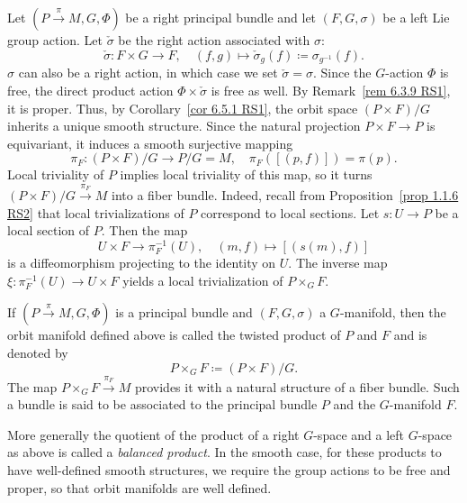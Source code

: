 Let $(P\overset{\pi}{\to}M,G,\Phi)$ be a right principal bundle and let $(F,G,\sigma)$ be a left Lie group action. Let $\check\sigma$ be the right action associated with $\sigma$:
\[\check\sigma:F\times G\to F,\quad (f,g)\mapsto \check{\sigma}_g(f)\coloneqq \sigma_{g^{-1}}(f).\]
$\sigma$ can also be a right action, in which case we set $\check\sigma=\sigma$. Since the $G$-action $\Phi$ is free, the direct product action $\Phi\times \check\sigma$ is free as well. By Remark~\ref{rem 6.3.9 RS1}, it is proper. Thus, by Corollary~\ref{cor 6.5.1 RS1}, the orbit space $(P\times F)\slash G$ inherits a unique smooth structure. Since the natural projection $P\times F\to P$ is equivariant, it induces a smooth surjective mapping
\[\pi_F:(P\times F)\slash G\to P\slash G=M,\quad \pi_F([(p,f)])=\pi(p).\]
Local triviality of $P$ implies local triviality of this map, so it turns $(P\times F)\slash G \overset{\pi_F}{\to } M$ into a fiber bundle. Indeed, recall from Proposition~\ref{prop 1.1.6 RS2} that local trivializations of $P$ correspond to local sections. Let $s:U\to P$ be a local section of $P$. Then the map
\[U\times F\to \pi_F^{-1}(U),\quad (m,f)\mapsto [(s(m),f)]\]
is a diffeomorphism projecting to the identity on $U$. The inverse map $\xi:\pi_F^{-1}(U)\to U\times F$ yields a local trivialization of $P\times_G F$.

\begin{defn}
    If $(P\overset{\pi}{\to}M,G,\Phi)$ is a principal bundle and  $(F,G,\sigma)$ a $G$-manifold, then the orbit manifold defined above is called the twisted product of $P$ and $F$ and is denoted by
    \[P\times_G F\coloneqq (P\times F)\slash G.\]
    The map $P\times_G F\overset{\pi_F}{\to } M$ provides it with a natural structure of a fiber bundle. Such a bundle is said to be associated to the principal bundle $P$ and the $G$-manifold $F$.
\end{defn}

More generally the quotient of the product of a right $G$-space and a left $G$-space as above is called a \emph{balanced product}. In the smooth case, for these products to have well-defined smooth structures, we require the group actions to be free and proper, so that orbit manifolds are well defined.

